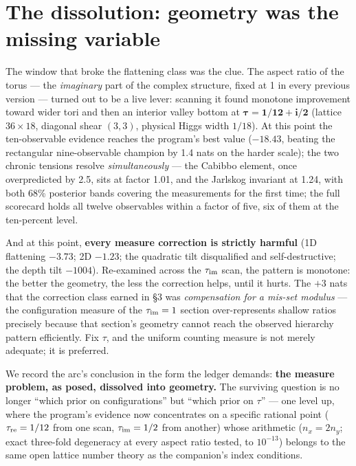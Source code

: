 \documentclass[aps,prd,preprint,nofootinbib]{revtex4-2}
\begin{document}
\section{The dissolution: geometry was the missing variable}
\label{sec:dissolve}

The window that broke the flattening class was the clue. The aspect ratio of
the torus --- the \emph{imaginary} part of the complex structure, fixed at 1 in
every previous version --- turned out to be a live lever: scanning it found
monotone improvement toward wider tori and then an interior valley bottom at
$\boldsymbol{\tau=1/12+i/2}$ (lattice $36\times 18$, diagonal shear $(3,3)$,
physical Higgs width $1/18$). At this point the ten-observable evidence reaches
the program's best value ($-18.43$, beating the rectangular nine-observable
champion by 1.4 nats on the harder scale); the two chronic tensions resolve
\emph{simultaneously} --- the Cabibbo element, once overpredicted by 2.5, sits
at factor 1.01, and the Jarlskog invariant at 1.24, with both 68\% posterior
bands covering the measurements for the first time; the full scorecard holds
all twelve observables within a factor of five, six of them at the ten-percent
level.

And at this point, \textbf{every measure correction is strictly harmful} (1D
flattening $-3.73$; 2D $-1.23$; the quadratic tilt disqualified and
self-destructive; the depth tilt $-1004$). Re-examined across the
$\tau_{\rm im}$ scan, the pattern is monotone: the better the geometry, the
less the correction helps, until it hurts. The $+3$ nats that the correction
class earned in \S3 was \emph{compensation for a mis-set modulus} --- the
configuration measure of the $\tau_{\rm im}=1$ section over-represents shallow
ratios precisely because that section's geometry cannot reach the observed
hierarchy pattern efficiently. Fix $\tau$, and the uniform counting measure is
not merely adequate; it is preferred.

We record the arc's conclusion in the form the ledger demands: \textbf{the
measure problem, as posed, dissolved into geometry.} The surviving question is
no longer ``which prior on configurations'' but ``which prior on $\tau$'' ---
one level up, where the program's evidence now concentrates on a specific
rational point ($\tau_{\rm re}=1/12$ from one scan, $\tau_{\rm im}=1/2$ from
another) whose arithmetic ($n_x=2n_y$; exact three-fold degeneracy at every
aspect ratio tested, to $10^{-13}$) belongs to the same open lattice number
theory as the companion's index conditions.
\end{document}
